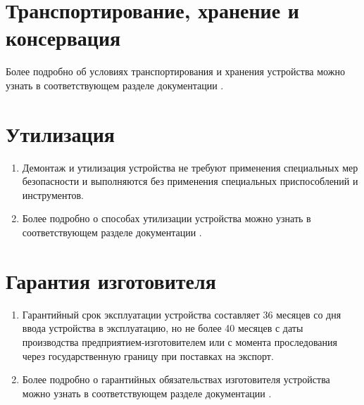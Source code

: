 {\color{unimain}\section[Транспортирование, хранение и консервация]{Транспортирование, хранение и консервация}\label{sec:trans}}

Более подробно об условиях транспортирования и хранения устройства можно узнать в соответствующем разделе документации \ManualUnitGeneral.

{\color{unimain}\section[Утилизация]{Утилизация}\label{sec:util}}

\begin{enumerate}[label=\arabic{section}.\arabic*, labelsep=4pt, leftmargin=0pt, itemindent=57pt] %
\item Демонтаж и утилизация устройства не требуют применения специальных мер безопасности и выполняются без применения специальных приспособлений и инструментов.
\item Более подробно о способах утилизации устройства можно узнать в соответствующем разделе документации \ManualUnitGeneral.
\end{enumerate}

{\color{unimain}\section[Гарантия изготовителя]{Гарантия изготовителя}\label{sec:garantee}}

\begin{enumerate}[label=\arabic{section}.\arabic*, labelsep=4pt, leftmargin=0pt, itemindent=57pt] %
\item Гарантийный срок эксплуатации устройства составляет 36 месяцев со дня ввода устройства в эксплуатацию, но не более 40 месяцев с даты производства предприятием-изготовителем или с момента проследования через государственную границу при поставках на экспорт.
\item Более подробно о гарантийных обязательствах изготовителя устройства можно узнать в соответствующем разделе документации \ManualUnitGeneral.
\end{enumerate}

